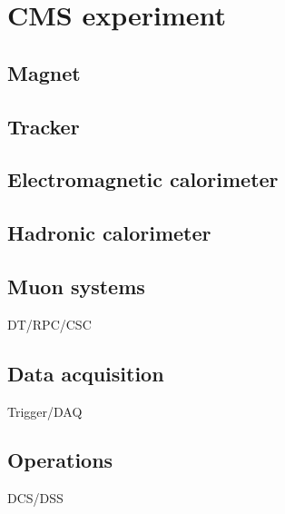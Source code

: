 \section{CMS experiment}
\label{sec:experiment-cms}


\subsection{Magnet}

\cite{Acquistapace:1997fm}

\subsection{Tracker}



\cite{Chatrchyan:2014fea}

\subsection{Electromagnetic calorimeter}

\subsection{Hadronic calorimeter}

\subsection{Muon systems}
DT/RPC/CSC

\subsection{Data acquisition}
Trigger/DAQ

\subsection{Operations}
DCS/DSS
